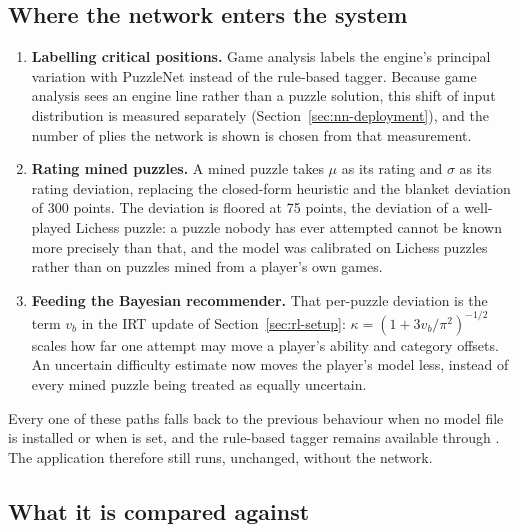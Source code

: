 \subsection{Where the network enters the system}\label{sec:integration-irt}

\begin{enumerate}
  \item \textbf{Labelling critical positions.} Game analysis labels the engine's principal variation
        with PuzzleNet instead of the rule-based tagger. Because game analysis sees an engine line
        rather than a puzzle solution, this shift of input distribution is measured separately
        (Section~\ref{sec:nn-deployment}), and the number of plies the network is shown is chosen from
        that measurement.
  \item \textbf{Rating mined puzzles.} A mined puzzle takes $\mu$ as its rating and $\sigma$ as its
        rating deviation, replacing the closed-form heuristic and the blanket deviation of 300 points.
        The deviation is floored at 75 points, the deviation of a well-played Lichess puzzle: a puzzle
        nobody has ever attempted cannot be known more precisely than that, and the model was
        calibrated on Lichess puzzles rather than on puzzles mined from a player's own games.
  \item \textbf{Feeding the Bayesian recommender.} That per-puzzle deviation is the term $v_b$ in the
        IRT update of Section~\ref{sec:rl-setup}: $\kappa = (1 + 3 v_b / \pi^2)^{-1/2}$ scales how far
        one attempt may move a player's ability and category offsets. An uncertain difficulty estimate
        now moves the player's model less, instead of every mined puzzle being treated as equally
        uncertain.
\end{enumerate}

Every one of these paths falls back to the previous behaviour when no model file is installed or when
 is set, and the rule-based tagger remains available through .
The application therefore still runs, unchanged, without the network.

\subsection{What it is compared against}

